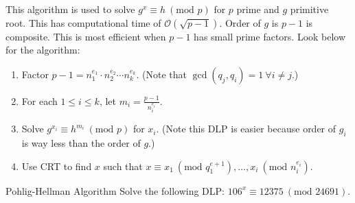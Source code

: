 This algorithm is used to solve \(g^x \equiv h \ (\text{mod } p)\) for \(p\) prime and \(g\) primitive root. This has computational time of \(\mathcal{O}(\sqrt{p-1})\). Order of \(g\) is \(p-1\) is composite. This is most efficient when \(p - 1\) has small prime factors. Look below for the algorithm:

\begin{enumerate}
    \item Factor \(p - 1 = n_1^{e_1} \cdot n_2^{e_2} \cdots n_k^{e_k}\). (Note that \(\gcd(q_j, q_i) = 1 \  \forall i \ne j\).)
    \item For each \(1 \leq i \leq k\), let \(m_i = \frac{p-1}{n_i^{e_i}}\).
    \item Solve \(g^{x_i} \equiv h^{m_i} \ (\text{mod } p)\) for \(x_i\). (Note this DLP is easier because order of \(g_i\) is way less than the order of \(g\).)
    \item Use CRT to find \(x\) such that \(x \equiv x_1 \ (\text{mod } q_1^{e+1}), \dots, x_i \ (\text{mod } n_i^{e_i})\).
\end{enumerate}

\begin{example}
    {Pohlig-Hellman Algorithm} Solve the following DLP: \(106^x \equiv 12375 \ (\text{mod } 24691)\).
\end{example}

